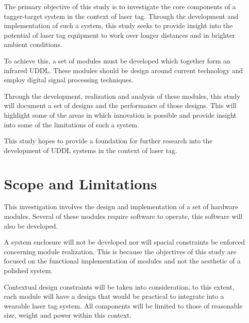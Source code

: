 

The primary objective of this study is to investigate the core components of a tagger-target system in the context of laser tag. Through the development and implementation of such a system, this study seeks to provide insight into the potential of laser tag equipment to work over longer distances and in brighter ambient conditions.

To achieve this, a set of modules must be developed which together form an infrared UDDL. These modules should be design around current technology and employ digital signal processing techniques.

Through the development, realization and analysis of these modules, this study will document a set of designs and the performance of those designs. This will highlight some of the areas in which innovation is possible and provide insight into some of the limitations of such a system.

This study hopes to provide a foundation for further research into the development of UDDL systems in the context of laser tag.



\section{Scope and Limitations}


This investigation involves the design and implementation of a set of hardware modules. Several of these modules require software to operate, this software will also be developed.

A system enclosure will not be developed nor will spacial constraints be enforced concerning module realization. This is because the objectives of this study are focused on the functional implementation of modules and not the aesthetic of a polished system.

Contextual design constraints will be taken into consideration, to this extent, each module will have a design that would be practical to integrate into a wearable laser tag system. All components will be limited to those of reasonable size, weight and power within this context.

